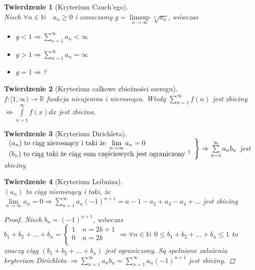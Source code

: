 \documentclass[12pt,a4paper]{article}
\newtheorem{tw}{Twierdzenie}
\theoremstyle{definition}
\begin{document}
\begin{tw}[Kryterium Cauch'ego]~\\
Niech $\forall n\in\mathbb{N} \quad a_n \geqslant 0$ i oznaczamy $g = \limsup\limits_{n\to\infty} \sqrt[n]{a_n}$, wówczas
\begin{itemize}
	\item $g < 1 \Rightarrow \sum\limits_{n=1}^\infty a_n < \infty$
	\item $g > 1 \Rightarrow \sum\limits_{n=1}^\infty a_n = \infty$
	\item $g = 1 \Rightarrow $?
\end{itemize}
\end{tw}

\begin{tw}[Kryterium całkowe zbieżności szeregu]~\\
$f: [1, \infty) \to \mathbb{R}$ funkcja nieujemna i nierosnąca. Wtedy 
$\sum\limits_{n=1}^\infty f(n)$ jest zbieżny $\Leftrightarrow \int\limits_{n=1}^\infty f(x)dx$ jest zbieżna.
\end{tw}

\begin{tw}[Kryterium Dirichleta]~\\

$\left.
\begin{array}{l}
	(a_n) \text{ to ciąg nierosnący i taki że } \lim\limits_{n\to\infty} a_n = 0\\
	(b_n) \text{ to ciąg taki że ciąg sum częściowych jest ograniczony }\footnotemark[1]
\end{array} 
\right\rbrace \Rightarrow \sum\limits_{n=1}^\infty a_nb_n$ jest zbieżny
\end{tw}

\begin{tw}[Kryterium Leibniza]~\\
$(a_n)$ to ciąg nierosnący i taki, że $\lim\limits_{n\to\infty} a_n = 0 \Rightarrow \sum\limits_{n=1}^\infty a_n(-1)^{n+1} = a-1 - a_2 + a_3 - a_4 + \dots$ jest zbieżny
\begin{proof}
Niech $b_n = (-1)^{n+1}$, wówczas $b_1 + b_2 + \dots + b_n = 
	\begin{cases}
		1 \quad n=2k+1\\
		0 \quad n=2k\\
 	\end{cases}
\Rightarrow \forall n\in\mathbb{N} ~~ 0\leqslant b_1 + b_2 + \dots + b_n \leqslant 1$ to znaczy ciąg $(b_1 + b_2 + \dots + b_n)$ jest ograniczony. Są spełnione założenia kryterium Dirichleta $\Rightarrow \sum\limits_{n=1}^\infty a_nb_n = \sum\limits_{n=1}^\infty a_n(-1)^{n+1}$ jest zbieżny. 
\end{proof}
\end{tw}
\end{document}
